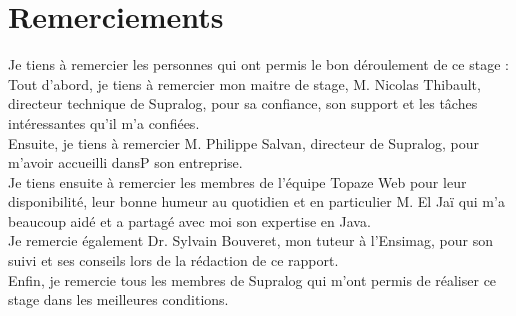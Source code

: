 \newpage
\section*{Remerciements}

Je tiens à remercier les personnes qui ont permis le bon déroulement de ce stage : \\

Tout d'abord, je tiens à remercier mon maitre de stage, M. Nicolas Thibault, directeur technique de Supralog, pour sa confiance, son support et les tâches intéressantes qu'il m'a confiées.\\

Ensuite, je tiens à remercier M. Philippe Salvan, directeur de Supralog, pour m'avoir accueilli dansP son entreprise.\\

Je tiens ensuite à remercier les membres de l'équipe Topaze Web pour leur disponibilité, leur bonne humeur au quotidien et en particulier M. El Jaï qui m'a beaucoup aidé et a partagé avec moi son expertise en Java.\\

Je remercie également Dr. Sylvain Bouveret, mon tuteur à l'Ensimag, pour son suivi et ses conseils lors de la rédaction de ce rapport.\\

Enfin, je remercie tous les membres de Supralog qui m'ont permis de réaliser ce stage dans les meilleures conditions.

